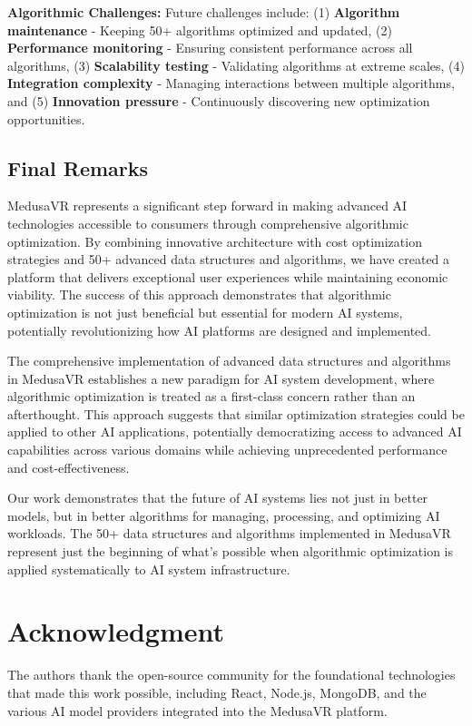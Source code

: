 \documentclass[conference]{IEEEtran}
\begin{document}
\textbf{Algorithmic Challenges:} Future challenges include: (1) \textbf{Algorithm maintenance} - Keeping 50+ algorithms optimized and updated, (2) \textbf{Performance monitoring} - Ensuring consistent performance across all algorithms, (3) \textbf{Scalability testing} - Validating algorithms at extreme scales, (4) \textbf{Integration complexity} - Managing interactions between multiple algorithms, and (5) \textbf{Innovation pressure} - Continuously discovering new optimization opportunities.

\subsection{Final Remarks}
MedusaVR represents a significant step forward in making advanced AI technologies accessible to consumers through comprehensive algorithmic optimization. By combining innovative architecture with cost optimization strategies and 50+ advanced data structures and algorithms, we have created a platform that delivers exceptional user experiences while maintaining economic viability. The success of this approach demonstrates that algorithmic optimization is not just beneficial but essential for modern AI systems, potentially revolutionizing how AI platforms are designed and implemented.

The comprehensive implementation of advanced data structures and algorithms in MedusaVR establishes a new paradigm for AI system development, where algorithmic optimization is treated as a first-class concern rather than an afterthought. This approach suggests that similar optimization strategies could be applied to other AI applications, potentially democratizing access to advanced AI capabilities across various domains while achieving unprecedented performance and cost-effectiveness.

Our work demonstrates that the future of AI systems lies not just in better models, but in better algorithms for managing, processing, and optimizing AI workloads. The 50+ data structures and algorithms implemented in MedusaVR represent just the beginning of what's possible when algorithmic optimization is applied systematically to AI system infrastructure.

\section*{Acknowledgment}
The authors thank the open-source community for the foundational technologies that made this work possible, including React, Node.js, MongoDB, and the various AI model providers integrated into the MedusaVR platform.
\end{document}
